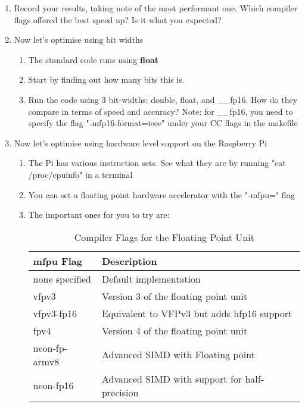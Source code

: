 \begin{enumerate}
\begin{enumerate}
\begin{table}[H]
\begin{tabular}{|l|l|}
        \end{tabular}
        \end{table}
    \end{enumerate}
    \item Record your results, taking note of the most performant one. Which compiler flags offered the best speed up? Is it what you expected?
    \item Now let's optimise using bit widths
    \begin{enumerate}
        \item The standard code runs using \textbf{float}
        \item Start by finding out how many bits this is.
        \item Run the code using 3 bit-widths: double, float, and \_\_fp16. How do they compare in terms of speed and accuracy? Note: for \_\_fp16, you need to specify the flag "-mfp16-format=ieee" under your \textdollar CC flags in the makefile
    \end{enumerate}
    \item Now let's optimise using hardware level support on the Raspberry Pi
    \begin{enumerate}
        \item The Pi has various instruction sets. See what they are by running "cat /proc/cpuinfo" in a terminal
        \item You can set a floating point hardware accelerator with the "-mfpu=" flag
        \item The important ones for you to try are:
            \begin{table}[H]
            \centering
            \caption[Compiler Flags for the Floating Point Unit]{Compiler Flags for the Floating Point Unit}
            \label{tbl:CompilerFlags}
            \begin{tabular}{|l|l|}
            \hline
            \textbf{mfpu Flag} & \textbf{Description} \\ \hline
            none specified & Default implementation \\ \hline
            vfpv3 & Version 3 of the floating point unit \\ \hline
            vfpv3-fp16 & Equivalent to VFPv3 but adds hfp16 support \\ \hline
            fpv4 & Version 4 of the floating point unit \\ \hline
            neon-fp-armv8 & Advanced SIMD with Floating point \\ \hline
            neon-fp16 & Advanced SIMD with support for half-precision \\ \hline

\end{tabular}
\end{table}
\end{enumerate}
\end{enumerate}
